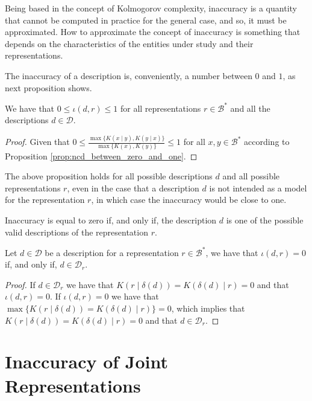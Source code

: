 Being based in the concept of Kolmogorov complexity, inaccuracy is a quantity that cannot be computed in practice for the general case, and so, it must be approximated. How to approximate the concept of inaccuracy is something that depends on the characteristics of the entities under study and their representations.

The inaccuracy of a description is, conveniently, a number between $0$ and $1$, as next proposition shows.

\begin{proposition}
\label{prop:inaccuracy:inaccuracy:range}
We have that $0 \leq \iota(d, r) \leq 1$ for all representations $r \in \mathcal{B}^\ast$ and all the descriptions $d \in \mathcal{D}$.
\end{proposition}
\begin{proof}
Given that $0 \leq \frac{ \max\{ K(x \mid y), K(y \mid x) \} } { \max\{ K(x), K(y) \} } \leq 1$ for all $x, y \in \mathcal{B}^\ast$ according to Proposition \ref{prop:ncd_between_zero_and_one}.
\end{proof}

The above proposition holds for all possible descriptions $d$ and all possible representations $r$, even in the case that a description $d$ is not intended as a model for the representation $r$, in which case the inaccuracy would be close to one.

Inaccuracy is equal to zero if, and only if, the description $d$ is one of the possible valid descriptions of the representation $r$.

\begin{proposition}\label{prop:perfect_description}
Let $d \in \mathcal{D}$ be a description for a representation $r \in \mathcal{B}^\ast$, we have that $\iota(d, r) = 0$ if, and only if, $d \in \mathcal{D}_r$.
\end{proposition}
\begin{proof}
If $d \in \mathcal{D}_r$ we have that $K \left( r \mid \delta(d) \right) = K \left( \delta(d) \mid r \right) = 0$ and that $\iota(d, r) = 0$. If $\iota(d, r) = 0$ we have that $\max\{ K \left( r \mid \delta(d) \right) = K \left( \delta(d) \mid r \right) \} = 0$, which implies that $K \left( r \mid \delta(d) \right) = K \left( \delta(d) \mid r \right) = 0$ and that $d \in \mathcal{D}_r$.
\end{proof}

%
%

\section{Inaccuracy of Joint Representations}

